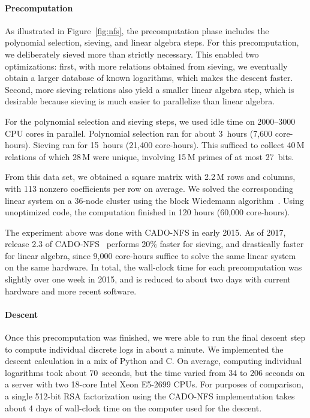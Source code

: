 \paragraph{Precomputation}
As illustrated in Figure~\ref{fig:nfs}, the precomputation phase includes the
polynomial selection, sieving, and linear algebra steps. For this
precomputation, we deliberately sieved more than strictly necessary. This
enabled two optimizations: first, with more relations obtained from sieving,
we eventually obtain a larger database of known logarithms, which makes the
descent faster. Second, more sieving relations also yield a smaller linear
algebra step, which is desirable because sieving is much easier to
parallelize than linear algebra.

For the polynomial selection and sieving steps, we used idle time on
2000--3000 CPU cores in parallel. Polynomial selection ran for about 3~hours
(7,600 core-hours). Sieving ran for 15~hours (21,400 core-hours). This
sufficed to collect 40\,M relations of which 28\,M were unique, involving
15\,M primes of at most 27~bits.

From this data set, we obtained a square matrix with 2.2\,M rows and columns,
with 113 nonzero coefficients per row on average. We solved the corresponding
linear system on a 36-node cluster using the block Wiedemann
algorithm~\cite{coppersmith-block-wiedemann-1994,thome-block-wiedemann-2002}.
Using unoptimized code, the computation finished in 120 hours (60,000
core-hours).

The experiment above was done with CADO-NFS in early 2015. As of 2017,
release 2.3 of CADO-NFS~\cite{cado-nfs-2.3} performs 20\% faster for sieving,
and drastically faster for linear algebra, since 9,000 core-hours suffice to
solve the same linear system on the same hardware. In total, the wall-clock
time for each precomputation was slightly over one week in 2015, and is
reduced to about two days with current hardware and more recent software.

\paragraph{Descent}
Once this precomputation was finished, we were able to run the final descent
step to compute individual discrete logs in about a minute. We implemented
the descent calculation in a mix of Python and C\@. On average, computing
individual logarithms took about 70~seconds, but the time varied from 34 to
206 seconds on a server with two 18-core Intel Xeon E5-2699 CPUs. For
purposes of comparison, a single 512-bit RSA factorization using the CADO-NFS
implementation takes about 4 days of wall-clock time on the computer used for
the descent\cite{cado-nfs-2.3}.

